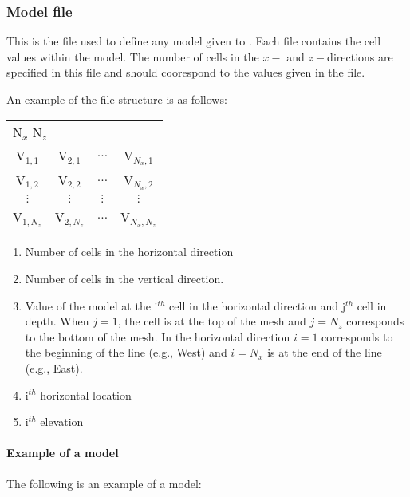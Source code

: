 \subsubsection{Model file}

This is the file used to define any model given to . Each file contains the cell values within the model. The number of cells in the $x-$ and $z-$directions are specified in this file and should coorespond to the values given in the  file.

An example of the  file structure is as follows:

\begin{fileExample}
\begin{tabular}{|cccc|}
\hline
\multicolumn{4}{|l|}{N$_x$ N$_z$} \\
V$_{1,1}$ & V$_{2,1}$ & $\hdots$ & V$_{N_x,1}$ \\
V$_{1,2}$ & V$_{2,2}$ & $\hdots$ & V$_{N_x,2}$ \\
$\vdots$ &  $\vdots$ &  $\vdots$ &  $\vdots$ \\
V$_{1,N_z}$ & V$_{2,N_z}$ & $\hdots$ & V$_{N_x,N_z}$ \\
\hline
\end{tabular}
\end{fileExample}

\begin{enumerate}
\item[\codeName{N$_x$}] Number of cells in the horizontal direction
\item[\codeName{N$_z$}] Number of cells in the vertical direction. 
\item[\codeName{V$_{i,k}$ }] Value of the model at the i$^{th}$ cell in the horizontal direction and j$^{th}$ cell in depth. When $j=1$, the cell is at the top of the mesh and $j=N_z$ corresponds to the bottom of the mesh. In the horizontal direction $i=1$ corresponds to the beginning of the line (e.g., West) and $i=N_x$ is at the end of the line (e.g., East). 
\item[\codeName{X$_i$}] i$^{th}$ horizontal location 
\item[\codeName{elev$_i$}] i$^{th}$ elevation
\end{enumerate}

\paragraph{Example of a model} 

The following is an example of a model:

